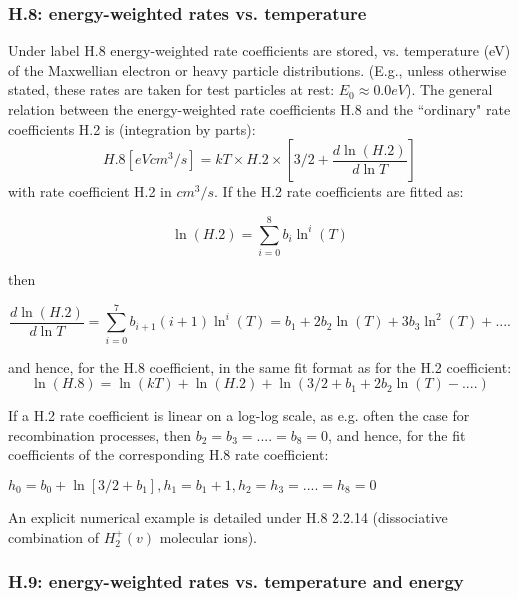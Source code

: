 \documentclass[12pt,dvipdfmx]{article}
\begin{document}
\subsubsection{H.8: energy-weighted rates vs. temperature}\label{sec1.3.8}
Under label H.8 energy-weighted rate coefficients are stored, vs. temperature (eV) of the
Maxwellian electron or heavy particle distributions.
(E.g., unless otherwise stated, these rates are taken for test particles at rest: $E_0 \approx 0.0 eV$).
The general relation between the energy-weighted rate coefficients
H.8 and the ``ordinary" rate coefficients H.2
is (integration by parts):
\begin{equation}
H.8 [eV cm^3/s]= kT \times H.2 \times \left[3/2+\frac{d \ln(H.2)}{d \ln T}\right]
\end{equation}
with rate coefficient H.2 in $cm^3/s$.
If the H.2 rate coefficients are fitted as:

\begin{equation}
\ln(H.2) = \sum_{i=0}^8  b_i \ln^i(T)
\end{equation}

then

\begin{equation}
\frac{d \ln(H.2)}{d \ln T}= \sum_{i=0}^7  b_{i+1} (i+1)  \ln^i(T) = b_1 + 2b_2 \ln(T) + 3b_3 \ln^2(T) + ....
\end{equation}

and hence, for the  H.8 coefficient, in the same fit format as for the H.2 coefficient:
\begin{equation}
\ln(H.8) = \ln(kT) +  \ln(H.2) + \ln(3/2 + b_1 + 2b_2 \ln(T) - ....)
\end{equation}

If a H.2 rate coefficient is linear on a log-log scale, as e.g. often the case for recombination processes, then
$b_2 =b_3 =....=b_8 = 0$, and hence, for the fit coefficients of the corresponding H.8 rate coefficient:

$h_0=b_0 + \ln [3/2 + b_1],  h_1=b_1+1,  h_2 = h_3 = ....=h_8 = 0$

An explicit numerical example is detailed under H.8 2.2.14 (dissociative combination of $H_2^+(v)$ molecular ions).




\subsubsection{H.9: energy-weighted rates vs. temperature and energy}\label{sec1.3.9}
\end{document}
